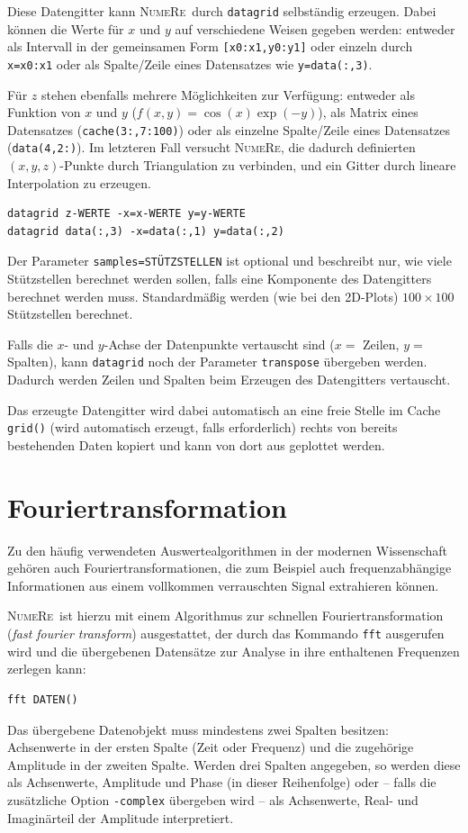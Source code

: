 \documentclass[DIV=14,headsepline,footsepline]{scrbook}
\newcommand{\NR}{\textsc{Nu\-me\-Re}}
\begin{document}
				Diese Datengitter kann \NR\ durch \verb+datagrid+ selbständig erzeugen. Dabei können die Werte für $x$ und $y$ auf verschiedene Weisen gegeben werden: entweder als Intervall in der gemeinsamen Form \verb+[x0:x1,y0:y1]+ oder einzeln durch \verb+x=x0:x1+ oder als Spalte/Zeile eines Datensatzes wie \verb+y=data(:,3)+.
				
				Für $z$ stehen ebenfalls mehrere Möglichkeiten zur Verfügung: entweder als Funktion von $x$ und $y$ ($f(x,y) = \cos(x)\exp(-y)$), als Matrix eines Datensatzes (\verb+cache(3:,7:100)+) oder als einzelne Spalte/Zeile eines Datensatzes (\verb+data(4,2:)+). Im letzteren Fall versucht \NR, die dadurch definierten $(x,y,z)$-Punkte durch Triangulation zu verbinden, und ein Gitter durch lineare Interpolation zu erzeugen.
				\begin{lstlisting}
datagrid z-WERTE -x=x-WERTE y=y-WERTE
datagrid data(:,3) -x=data(:,1) y=data(:,2)
				\end{lstlisting}
				
				Der Parameter \verb+samples=STÜTZSTELLEN+ ist optional und beschreibt nur, wie viele Stützstellen berechnet werden sollen, falls eine Komponente des Datengitters berechnet werden muss. Standardmäßig werden (wie bei den 2D-Plots) $100 \times 100$ Stützstellen berechnet.
				
				Falls die $x$- und $y$-Achse der Datenpunkte vertauscht sind ($x =$ Zeilen, $y =$ Spalten), kann \verb+datagrid+ noch der Parameter \verb+transpose+ übergeben werden. Dadurch werden Zeilen und Spalten beim Erzeugen des Datengitters vertauscht.
	
				Das erzeugte Datengitter wird dabei automatisch an eine freie Stelle im Cache \verb+grid()+ (wird automatisch erzeugt, falls erforderlich) rechts von bereits bestehenden Daten kopiert und kann von dort aus geplottet werden.
				
			\section{Fouriertransformation}
				Zu den häufig verwendeten Auswertealgorithmen in der modernen Wissenschaft gehören auch Fouriertransformationen, die zum Beispiel auch frequenzabhängige Informationen aus einem vollkommen verrauschten Signal extrahieren können.
				
				\NR\ ist hierzu mit einem Algorithmus zur schnellen Fouriertransformation (\emph{fast fourier transform}) ausgestattet, der durch das Kommando \verb+fft+ ausgerufen wird und die übergebenen Datensätze zur Analyse in ihre enthaltenen Frequenzen zerlegen kann:
				\begin{lstlisting}
fft DATEN()
				\end{lstlisting}
				Das übergebene Datenobjekt muss mindestens zwei Spalten besitzen: Achsenwerte in der ersten Spalte (Zeit oder Frequenz) und die zugehörige Amplitude in der zweiten Spalte. Werden drei Spalten angegeben, so werden diese als Achsenwerte, Amplitude und Phase (in dieser Reihenfolge) oder -- falls die zusätzliche Option \verb+-complex+ übergeben wird -- als Achsenwerte, Real- und Imaginärteil der Amplitude interpretiert.
				
\end{document}
